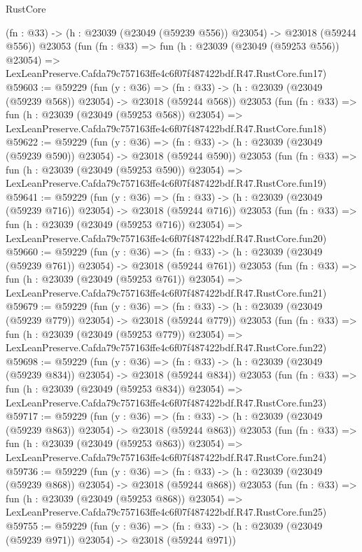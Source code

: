 \begin{lexlean}{RustCore}
\begin{coremodule}
    (fn : @33) -> (h : @23039 (@23049 (@59239 @556)) @23054) -> @23018 (@59244 @556))
    @23053
    (fun (fn : @33) =>
    fun (h : @23039 (@23049 (@59253 @556)) @23054) =>
    LexLeanPreserve.Cafda79c757163ffe4c6f07f487422bdf.R47.RustCore.fun17)
@59603 := @59229
    (fun (y : @36) =>
    (fn : @33) -> (h : @23039 (@23049 (@59239 @568)) @23054) -> @23018 (@59244 @568))
    @23053
    (fun (fn : @33) =>
    fun (h : @23039 (@23049 (@59253 @568)) @23054) =>
    LexLeanPreserve.Cafda79c757163ffe4c6f07f487422bdf.R47.RustCore.fun18)
@59622 := @59229
    (fun (y : @36) =>
    (fn : @33) -> (h : @23039 (@23049 (@59239 @590)) @23054) -> @23018 (@59244 @590))
    @23053
    (fun (fn : @33) =>
    fun (h : @23039 (@23049 (@59253 @590)) @23054) =>
    LexLeanPreserve.Cafda79c757163ffe4c6f07f487422bdf.R47.RustCore.fun19)
@59641 := @59229
    (fun (y : @36) =>
    (fn : @33) -> (h : @23039 (@23049 (@59239 @716)) @23054) -> @23018 (@59244 @716))
    @23053
    (fun (fn : @33) =>
    fun (h : @23039 (@23049 (@59253 @716)) @23054) =>
    LexLeanPreserve.Cafda79c757163ffe4c6f07f487422bdf.R47.RustCore.fun20)
@59660 := @59229
    (fun (y : @36) =>
    (fn : @33) -> (h : @23039 (@23049 (@59239 @761)) @23054) -> @23018 (@59244 @761))
    @23053
    (fun (fn : @33) =>
    fun (h : @23039 (@23049 (@59253 @761)) @23054) =>
    LexLeanPreserve.Cafda79c757163ffe4c6f07f487422bdf.R47.RustCore.fun21)
@59679 := @59229
    (fun (y : @36) =>
    (fn : @33) -> (h : @23039 (@23049 (@59239 @779)) @23054) -> @23018 (@59244 @779))
    @23053
    (fun (fn : @33) =>
    fun (h : @23039 (@23049 (@59253 @779)) @23054) =>
    LexLeanPreserve.Cafda79c757163ffe4c6f07f487422bdf.R47.RustCore.fun22)
@59698 := @59229
    (fun (y : @36) =>
    (fn : @33) -> (h : @23039 (@23049 (@59239 @834)) @23054) -> @23018 (@59244 @834))
    @23053
    (fun (fn : @33) =>
    fun (h : @23039 (@23049 (@59253 @834)) @23054) =>
    LexLeanPreserve.Cafda79c757163ffe4c6f07f487422bdf.R47.RustCore.fun23)
@59717 := @59229
    (fun (y : @36) =>
    (fn : @33) -> (h : @23039 (@23049 (@59239 @863)) @23054) -> @23018 (@59244 @863))
    @23053
    (fun (fn : @33) =>
    fun (h : @23039 (@23049 (@59253 @863)) @23054) =>
    LexLeanPreserve.Cafda79c757163ffe4c6f07f487422bdf.R47.RustCore.fun24)
@59736 := @59229
    (fun (y : @36) =>
    (fn : @33) -> (h : @23039 (@23049 (@59239 @868)) @23054) -> @23018 (@59244 @868))
    @23053
    (fun (fn : @33) =>
    fun (h : @23039 (@23049 (@59253 @868)) @23054) =>
    LexLeanPreserve.Cafda79c757163ffe4c6f07f487422bdf.R47.RustCore.fun25)
@59755 := @59229
    (fun (y : @36) =>
    (fn : @33) -> (h : @23039 (@23049 (@59239 @971)) @23054) -> @23018 (@59244 @971))

\end{coremodule}
\end{lexlean}

